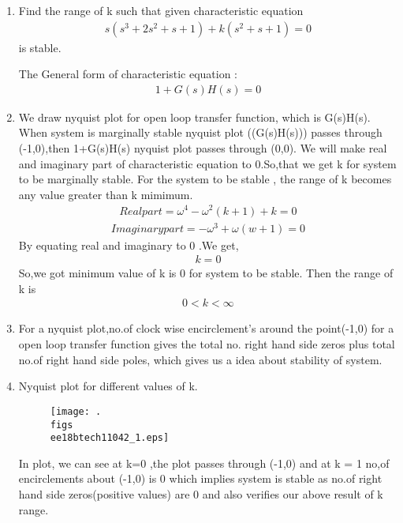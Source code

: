 \begin{enumerate}[label=\thesection.\arabic*.,ref=\thesection.\theenumi]
\item Find the range of k such that given characteristic equation
\begin{align}
s(s^3+2s^2+s+1) +k(s^2+s+1) = 0
\label{eq:ee18btech11042_1}
\end{align}
is stable.

\solution
The General form of characteristic equation :
\begin{align}
1+G(s)H(s) = 0
\label{eq:ee18btech11042_2}    
\end{align}
\item  We draw nyquist plot for open loop transfer function, which is G(s)H(s). When system is marginally stable nyquist plot ((G(s)H(s))) passes through (-1,0),then 1+G(s)H(s) nyquist plot passes through (0,0). We will make real and imaginary part of characteristic equation to 0.So,that  we  get  k for system to be  marginally stable. For the system to be stable , the range of k becomes any value greater than k mimimum.
\begin{align}
Real part = \omega^4 - \omega^2(k+1) +k = 0
\label{eq:ee18btech11042_3}
\end{align}
\begin{align}
Imaginary part = -\omega^3 +\omega(w+1) = 0
\label{eq:ee18btech11042_4}
\end{align}
By equating real and imaginary to 0 .We get,
\begin{align}
 k = 0
\label{eq:ee18btech11042_5}
\end{align}
So,we got minimum value of k is 0 for system to be stable. Then the range of k is
\begin{align}
0<k<\infty
\label{eq:ee18btech11042_6}
\end{align}

\item For a nyquist plot,no.of clock wise encirclement's around the point(-1,0) for a open loop transfer function gives the total no. right hand side  zeros plus total no.of right hand side poles, which gives us a idea about stability of system.
\item   Nyquist plot for different values of k.

\begin{figure}[!h]
  \texttt{[image: .\\figs\\ee18btech11042\_1.eps]}
  \label{fig:ee18btech11042_1.eps}
\end{figure}
 In plot, we can see at k=0 ,the plot passes through (-1,0) and  at k = 1 no,of encirclements about (-1,0) is 0 which implies system is stable as no.of right  hand side zeros(positive values) are 0 and also verifies our above result of k range.
 


\end{enumerate}
